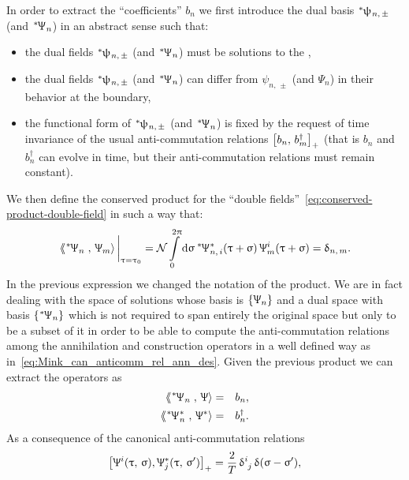 In order to extract the ``coefficients'' $b_n$ we first introduce the dual basis $\dual{\psi}_{n,\, \pm}$ (and $\dual{\Psi}_n$) in an abstract sense such that:
\begin{itemize}
  \item the dual fields $\dual{\psi}_{n,\, \pm}$ (and $\dual{\Psi}_n$) must be solutions to the \eom,

  \item the dual fields $\dual{\psi}_{n,\, \pm}$ (and $\dual{\Psi}_n$) can differ from $\psi_{n,\, \pm}$ (and $\Psi_n$) in their behavior at the boundary,

  \item the functional form of $\dual{\psi}_{n,\, \pm}$ (and $\dual{\Psi}_n$) is fixed by the request of time invariance of the usual anti-commutation relations $\left[ b_n,\, b_m^{\dagger} \right]_+$ (that is $b_n$ and $b_n^{\dagger}$ can evolve in time, but their anti-commutation relations must remain constant).
\end{itemize}
We then define the conserved product for the ``double fields''~\eqref{eq:conserved-product-double-field} in such a way that:
\begin{equation}
  \eval{\lconsprod{\dual{\Psi}_n}{\Psi_m}}_{\tau = \tau_0}
  =
  \cN
  \finiteint{\sigma}{0}{2\pi}
  \dual{\Psi}_{n,\, i}^{*}(\tau + \sigma)\,
  \Psi_m^i( \tau + \sigma )
  =
  \delta_{n,\, m}.
  \label{eq:conserved-product-dual-basis}
\end{equation}
In the previous expression we changed the notation of the product.
We are in fact dealing with the space of solutions whose basis is $\qty{ \Psi_n }$ and a dual space with basis $\qty{ \dual{\Psi}_n }$ which is not required to span entirely the original space but only to be a subset of it in order to be able to compute the anti-commutation relations among the annihilation and construction operators in a well defined way as in~\eqref{eq:Mink_can_anticomm_rel_ann_des}.
Given the previous product we can extract the operators as
\begin{eqnarray}
  \lconsprod{\dual{\Psi}_n}{\Psi} & = & b_n,
  \\
  \lconsprod{\dual{\Psi}_n^*}{\Psi^*} & = & b_n^{\dagger}.
\end{eqnarray}
As a consequence of the canonical anti-commutation relations
\begin{equation}
  \qty[
    \Psi^i\qty( \tau,\, \sigma ), \Psi^*_j\qty( \tau,\, \sigma' )
  ]_+
  =
  \frac{2}{T}\, \tensor{\delta}{^i_j}\, \delta( \sigma - \sigma' ),
\end{equation}
